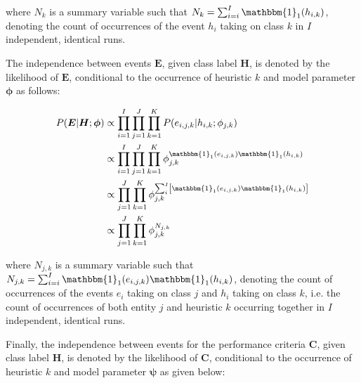 where $N_{k}$ is a summary variable such that $N_{k} = \sum_{i=i}^{I} \mathbbm{1}_{1}(h_{i,k})$, denoting the count of occurrences of the event $h_{i}$ taking on class $k$ in $I$ independent, identical runs.

The independence between events $\boldsymbol{E}$, given class label $\boldsymbol{H}$, is denoted by the likelihood of $\boldsymbol{E}$, conditional to the occurrence of heuristic $k$ and model parameter $\boldsymbol{\phi}$ as follows:

\begin{equation}
      \label{eq:bhh:selection_mechanism:naive_bayes:EgH_pmf}
      \begin{split}
            P(\boldsymbol{E} \vert \boldsymbol{H};  \boldsymbol{\phi})
            &\propto \prod_{i=1}^{I} \prod_{j=1}^{J} \prod_{k=1}^{K} P(e_{i,j,k} \vert h_{i,k} ; \phi_{j,k})  \\
            &\propto \prod_{i=1}^{I} \prod_{j=1}^{J} \prod_{k=1}^{K} \phi_{j,k}^{\mathbbm{1}_{1}(e_{i,j,k})\mathbbm{1}_{1}(h_{i,k})} \\
            &\propto \prod_{j=1}^{J} \prod_{k=1}^{K} \phi_{j,k}^{ \sum_{i}^{I} \left[ \mathbbm{1}_{1}(e_{i,j,k}) \mathbbm{1}_{1}(h_{i,k}) \right]} \\
            &\propto \prod_{j=1}^{J} \prod_{k=1}^{K} \phi_{j,k}^{N_{j,k}}
      \end{split}
\end{equation}

where $N_{j,k}$ is a summary variable such that $N_{j,k} = \sum_{i=i}^{I} \mathbbm{1}_{1}(e_{i,j,k})\mathbbm{1}_{1}(h_{i,k})$, denoting the count of occurrences of the events $e_{i}$ taking on class $j$ and $h_{i}$ taking on class $k$, i.e. the count of occurrences of both entity $j$ and heuristic $k$ occurring together in $I$ independent, identical runs.

Finally, the independence between events for the performance criteria $\boldsymbol{C}$, given class label $\boldsymbol{H}$, is denoted by the likelihood of $\boldsymbol{C}$, conditional to the occurrence of heuristic $k$ and model parameter $\boldsymbol{\psi}$ as given below:

